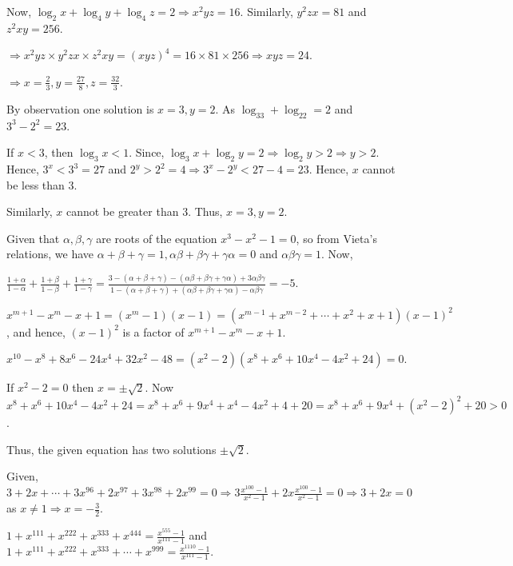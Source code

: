   Now, $\log_2x + \log_4y + \log_4z = 2 \Rightarrow x^2yz = 16$. Similarly, $y^2zx = 81$ and $z^2xy = 256$.

  $\Rightarrow x^2yz\times y^2zx\times z^2xy = (xyz)^4 = 16\times81\times256 \Rightarrow xyz = 24$.

  $\Rightarrow x = \frac{2}{3}, y = \frac{27}{8}, z = \frac{32}{3}$.
\item By observation one solution is $x = 3, y = 2$. As $\log_33 + \log_22 = 2$ and $3^3 - 2^2 = 23$.

  If $x < 3$, then $\log_3x < 1$. Since, $\log_3x + \log_2y = 2\Rightarrow \log_2y > 2\Rightarrow y >
  2$. Hence, $3^x < 3^3 = 27$ and $2^y > 2^2 = 4\Rightarrow 3^x - 2^y < 27 - 4 = 23$. Hence, $x$ cannot be
  less than $3$.

  Similarly, $x$ cannot be greater than $3$. Thus, $x = 3, y = 2$.
\item Given that $\alpha, \beta, \gamma$ are roots of the equation $x^3 - x^2 - 1 = 0$, so from Vieta's
  relations, we have $\alpha + \beta + \gamma = 1, \alpha\beta + \beta\gamma + \gamma\alpha = 0$ and
  $\alpha\beta\gamma = 1$. Now,

  $\frac{1 + \alpha}{1 - \alpha} + \frac{1 + \beta}{1 - \beta} + \frac{1 + \gamma}{1 - \gamma} = \frac{3 -
    (\alpha + \beta + \gamma) - (\alpha\beta + \beta\gamma + \gamma\alpha) + 3\alpha\beta\gamma}{1 - (\alpha
    + \beta + \gamma) + (\alpha\beta + \beta\gamma + \gamma\alpha) - \alpha\beta\gamma} = -5$.
\item $x^{m + 1} - x^m - x + 1 = (x^m - 1)(x - 1) = (x^{m - 1} + x^{m - 2} + \cdots + x^2 + x + 1)(x - 1)^2$,
  and hence, $(x - 1)^2$ is a factor of $x^{m + 1} - x^m - x + 1$.
\item $x^{10} - x^{8} + 8x^6 - 24x^4 + 32x^2 - 48 = (x^2 - 2)(x^8 + x^6 + 10x^4 - 4x^2 + 24) = 0$.

  If $x^2 - 2 = 0$ then $x = \pm\sqrt{2}$. Now $x^8 + x^6 + 10x^4 - 4x^2 + 24 = x^8 + x^6 + 9x^4 + x^4 -
  4x^2 + 4 + 20 = x^8 + x^6 + 9x^4 + (x^2 - 2)^2 + 20 > 0$.

  Thus, the given equation has two solutions $\pm\sqrt{2}$.
\item Given, $3 + 2x + \cdots + 3x^{96} + 2x^{97} + 3x^{98} + 2x^{99} = 0 \Rightarrow 3\frac{x^{100} -
  1}{x^2 - 1} + 2x\frac{x^{100} - 1}{x^2 - 1} = 0\Rightarrow 3 + 2x = 0$ as $x\neq 1\Rightarrow x =
  -\frac{3}{2}$.
\item $1 + x^{111} + x^{222} + x^{333} + x^{444} = \frac{x^{555} - 1}{x^{111} - 1}$ and $1 + x^{111} +
  x^{222} + x^{333} + \cdots + x^{999} = \frac{x^{1110} - 1}{x^{111} - 1}$.

